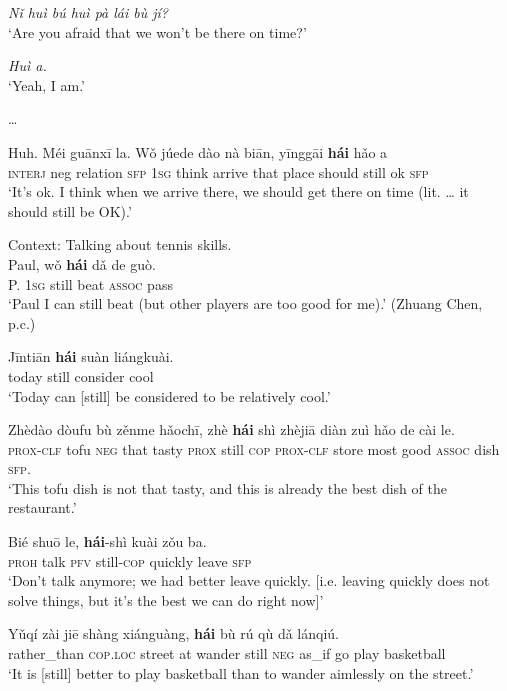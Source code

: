 \begin{exe}
	\ex\label{exAppendixMandarinMarginal1}
	\begin{xlist}
		\textit{Nǐ	huì	bú	huì	pà	lái	bù	jí?}\\
		\lq Are you afraid that we won’t be there on time?'
		
		\textit{Huì a.}\\
		\lq Yeah, I am.'
		
		\exi{} …
		
		\gll Huh. Méi guānxī	la.	Wǒ	júede	dào	nà	biān,	yīnggāi	\textbf{hái}	hǎo	a\\
		\textsc{interj} neg relation \textsc{sfp} 1\textsc{sg} think arrive that place should still ok \textsc{sfp}\\
		\glt \lq It’s ok. I think when we arrive there, we should get there on time (lit. … it should still be OK).\rq{ }\parencite[54–56]{Lu2019}
	\end{xlist} 
	
	\ex\label{exAppendixMandarinMarginal2}
	Context: Talking about tennis skills.\\
	\gll Paul, wǒ	\textbf{hái}	dǎ de guò.\\
	P. 1\textsc{sg} still beat \textsc{assoc} pass\\
	\glt \lq Paul I can still beat (but other players are too good for me).\rq{ }(Zhuang Chen, p.c.)
	
	\ex\label{exAppendixMandarinMarginal3}
	\gll Jīntiān		\textbf{hái}	suàn	liángkuài.\\
	today still consider cool\\
	\glt \lq Today can [still] be considered to be relatively cool.'
	\parencite[67]{Liu2000}
	
	\ex\label{exAppendixMandarinMarginal4}
	\gll Zhèdào	dòufu	bù	zěnme		hǎochī,	zhè	\textbf{hái}	shì	zhèjiā	diàn	zuì	hǎo	de cài	le.\\
	\textsc{prox}-\textsc{clf} tofu \textsc{neg} that tasty \textsc{prox} still \textsc{cop} \textsc{prox}-\textsc{clf} store most good \textsc{assoc} dish \textsc{sfp}.\\
	\glt \lq This tofu dish is not that tasty, and this is already the best dish of the restaurant.' \parencite[60]{Liu2000}
	
	\ex\label{exAppendixMandarinMarginal6}
	\gll Bié	shuō	le,	\textbf{hái}-shì	kuài	zǒu	ba.\\
	\textsc{proh} talk \textsc{pfv} still-\textsc{cop} quickly leave \textsc{sfp}\\
	\glt \lq Don't talk anymore; we had better leave quickly. [i.e. leaving quickly does not solve things, but it's the best we can do right now]\rq{ }\parencite[48]{Liu2000}

	\ex\label{exAppendixMandarinMarginal7}
	\gll Yǔqí	zài	jiē	shàng	xiánguàng,	\textbf{hái}	bù	rú	qù	dǎ	lánqiú.\\
	rather\_than \textsc{cop}.\textsc{loc} street at wander still \textsc{neg} as\_if go play basketball\\
	\glt \lq It is [still] better to play basketball than to wander aimlessly on the street.' \parencite[28]{HuangShi2016}
\end{exe}

